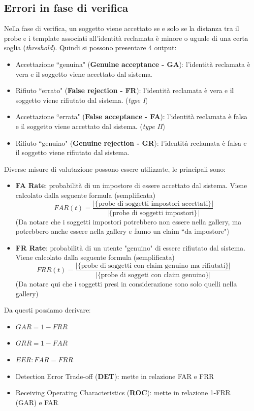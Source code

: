 \documentclass{article}
\begin{document}
\subsection{Errori in fase di verifica}
Nella fase di verifica, un soggetto viene accettato se e solo se la distanza tra il probe e i template associati all'identità reclamata è minore o uguale di una certa soglia (\textit{threshold}). Quindi si possono presentare 4 output:
\begin{itemize}
    \item Accettazione ``genuina" (\textbf{Genuine acceptance - GA}): l'identità reclamata è vera e il soggetto viene accettato dal sistema.
    \item Rifiuto ``errato" (\textbf{False rejection - FR}): l'identità reclamata è vera e il soggetto viene rifiutato dal sistema. (\textit{type I})
    \item Accettazione ``errata" (\textbf{False acceptance - FA}): l'identità reclamata è falsa e il soggetto viene accettato dal sistema. (\textit{type II})
    \item Rifiuto ``genuino" (\textbf{Genuine rejection - GR}): l'identità reclamata è falsa e il soggetto viene rifiutato dal sistema.
\end{itemize}

Diverse misure di valutazione possono essere utilizzate, le principali sono:
\begin{itemize}
    \item \textbf{FA Rate}: probabilità di un impostore di essere accettato dal sistema. Viene calcolato dalla seguente formula (semplificata) $$FAR(t) = \frac{|\{\text{probe di soggetti impostori accettati}\}|}{|\{\text{probe di soggetti impostori}\}|}$$ (Da notare che i soggetti impostori potrebbero non essere nella gallery, ma potrebbero anche essere nella gallery e fanno un claim ``da impostore")
    \item \textbf{FR Rate}: probabilità di un utente "genuino" di essere rifiutato dal sistema. Viene calcolato dalla seguente formula (semplificata) $$FRR(t) = \frac{|\{\text{probe di soggetti con claim genuino ma rifiutati}\}|}{|\{\text{probe di soggeti con claim genuino}\}|}$$ (Da notare qui che i soggetti presi in considerazione sono solo quelli nella gallery)
\end{itemize}

Da questi possiamo derivare:
\begin{itemize}
    \item $GAR = 1 - FRR$
    \item $GRR = 1 - FAR$
    \item $EER: FAR = FRR$
    \item Detection Error Trade-off (\textbf{DET}): mette in relazione FAR e FRR
    \item Receiving Operating Characteristics (\textbf{ROC}): mette in relazione 1-FRR (GAR) e FAR
\end{itemize}
\end{document}
